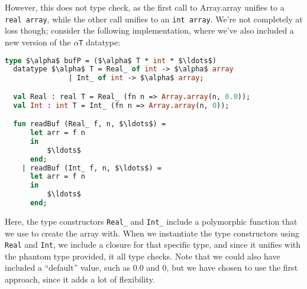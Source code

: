 However, this does not type check, as the first call to Array.array
unifies to a \texttt{real array}, while the other call unifies to an
\texttt{int array}. We're not completely at loss though; consider the
following implementation, where we've also included a new version of
the \texttt{$\alpha$T} datatype:

\begin{lstlisting}[language=ML, caption=readBuf implementation using
    closures,mathescape]
  type $\alpha$ bufP = ($\alpha$ T * int * $\ldots$)
  datatype $\alpha$ T = Real_ of int -> $\alpha$ array
               | Int_ of int -> $\alpha$ array;

  val Real : real T = Real_ (fn n => Array.array(n, 0.0));
  val Int : int T = Int_ (fn n => Array.array(n, 0));

  fun readBuf (Real_ f, n, $\ldots$) =
      let arr = f n
      in
          $\ldots$
      end;
    | readBuf (Int_ f, n, $\ldots$) =
      let arr = f n
      in
          $\ldots$
      end;
\end{lstlisting}

Here, the type constructors \texttt{Real\_} and \texttt{Int\_} include a
polymorphic function that we use to create the array with. When we
instantiate the type constructors using \texttt{Real} and
\texttt{Int}, we include a closure for that specific type, and since
it unifies with the phantom type provided, it all type checks. Note
that we could also have included a ``default'' value, such as $0.0$
and $0$, but we have chosen to use the first approach, since it adds a
lot of flexibility.
